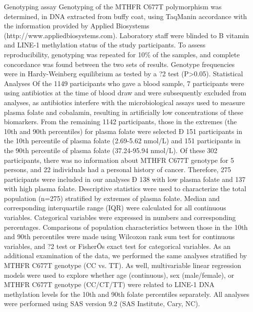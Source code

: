 Genotyping assay 
Genotyping of the MTHFR C677T polymorphism was determined, in DNA extracted from buffy coat, using TaqMan\textregistered in accordance with the information provided by Applied Biosystems (http://www.appliedbiosystems.com). Laboratory staff were blinded to B vitamin and LINE-1 methylation status of the study participants. To assess reproducibility, genotyping was repeated for 10\% of the samples, and complete concordance was found between the two sets of results. Genotype frequencies were in Hardy-Weinberg equilibrium as tested by a ?2 test (P>0.05). 
Statistical Analyses 
Of the 1149 participants who gave a blood sample, 7 participants were using antibiotics at the time of blood draw and were subsequently excluded from analyses, as antibiotics interfere with the microbiological assays used to measure plasma folate and cobalamin, resulting in artificially low concentrations of these biomarkers. From the remaining 1142 participants, those in the extremes (the 10th and 90th percentiles) for plasma folate were selected Ð 151 participants in the 10th percentile of plasma folate (2.69-5.62 nmol/L) and 151 participants in the 90th percentile of plasma folate (37.24-95.94 nmol/L). Of these 302 participants, there was no information about MTHFR C677T genotype for 5 persons, and 22 individuals had a personal history of cancer. Therefore, 275 participants were included in our analyses Ð 138 with low plasma folate and 137 with high plasma folate. 
Descriptive statistics were used to characterize the total population (n=275) stratified by extremes of plasma folate. Median and corresponding interquartile range (IQR) were calculated for all continuous variables. Categorical variables were expressed in numbers and corresponding percentages. Comparisons of population characteristics between those in the 10th and 90th percentiles were made using Wilcoxon rank sum test for continuous variables, and ?2 test or FisherÕs exact test for categorical variables. As an additional examination of the data, we performed the same analyses stratified by MTHFR C677T genotype (CC vs. TT). As well, multivariable linear regression models were used to explore whether age (continuous), sex (male/female), or MTHFR C677T genotype (CC/CT/TT) were related to LINE-1 DNA methylation levels for the 10th and 90th folate percentiles separately. All analyses were performed using SAS version 9.2 (SAS Institute, Cary, NC). 

